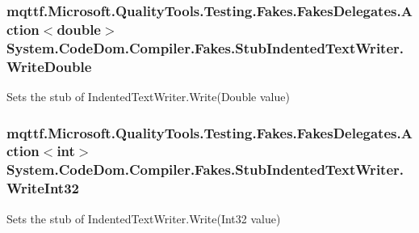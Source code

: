 \hypertarget{class_system_1_1_code_dom_1_1_compiler_1_1_fakes_1_1_stub_indented_text_writer_ae6acda772f2936f9d32db67a36564636}{
\subsubsection[{Write\-Double}]{\setlength{\rightskip}{0pt plus 5cm}mqttf.\-Microsoft.\-Quality\-Tools.\-Testing.\-Fakes.\-Fakes\-Delegates.\-Action$<$double$>$ System.\-Code\-Dom.\-Compiler.\-Fakes.\-Stub\-Indented\-Text\-Writer.\-Write\-Double}}\label{class_system_1_1_code_dom_1_1_compiler_1_1_fakes_1_1_stub_indented_text_writer_ae6acda772f2936f9d32db67a36564636}


Sets the stub of Indented\-Text\-Writer.\-Write(\-Double value)

\hypertarget{class_system_1_1_code_dom_1_1_compiler_1_1_fakes_1_1_stub_indented_text_writer_a10a90357f7d15fb8243d34942cfe71c1}{
\subsubsection[{Write\-Int32}]{\setlength{\rightskip}{0pt plus 5cm}mqttf.\-Microsoft.\-Quality\-Tools.\-Testing.\-Fakes.\-Fakes\-Delegates.\-Action$<$int$>$ System.\-Code\-Dom.\-Compiler.\-Fakes.\-Stub\-Indented\-Text\-Writer.\-Write\-Int32}}\label{class_system_1_1_code_dom_1_1_compiler_1_1_fakes_1_1_stub_indented_text_writer_a10a90357f7d15fb8243d34942cfe71c1}


Sets the stub of Indented\-Text\-Writer.\-Write(\-Int32 value)

